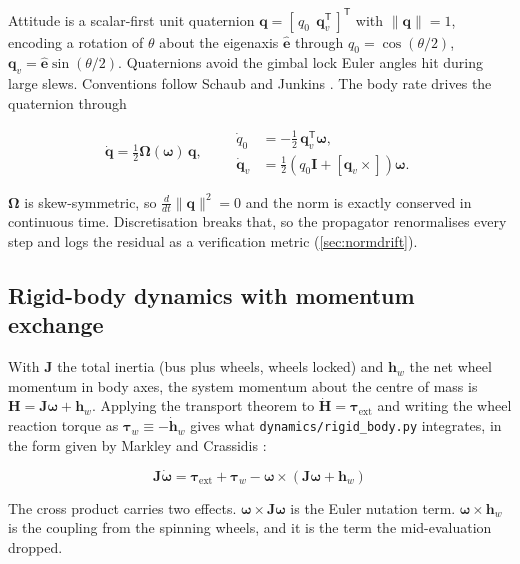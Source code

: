 \documentclass[conference,10pt,a4paper]{IEEEtran}
\newenvironment{eqbox}{\ignorespaces}{\ignorespacesafterend}
\newcommand{\vect}[1]{\bm{#1}}
\newcommand{\mat}[1]{\bm{#1}}
\newcommand{\T}{^{\mathsf{T}}}
\newcommand{\skewm}[1]{\left[#1\times\right]}
\begin{document}
Attitude is a scalar-first unit quaternion
$\vect{q} = [\,q_0\ \ \vect{q}_v\T\,]\T$ with $\|\vect{q}\|=1$, encoding a
rotation of $\theta$ about the eigenaxis $\hat{\vect{e}}$ through
$q_0=\cos(\theta/2)$, $\vect{q}_v=\hat{\vect{e}}\sin(\theta/2)$. Quaternions
avoid the gimbal lock Euler angles hit during large slews. Conventions follow
Schaub and Junkins \cite{schaub}. The body rate drives the quaternion through

\begin{equation}
\dot{\vect{q}} = \tfrac{1}{2}\mat{\Omega}(\vect{\omega})\,\vect{q},
\qquad
\begin{aligned}
\dot{q}_0 &= -\tfrac{1}{2}\,\vect{q}_v\T\vect{\omega},\\
\dot{\vect{q}}_v &= \tfrac{1}{2}\!\left(q_0\mat{I}+\skewm{\vect{q}_v}\right)\vect{\omega}.
\end{aligned}
\label{eq:kinematics}
\end{equation}

$\mat{\Omega}$ is skew-symmetric, so $\tfrac{d}{dt}\|\vect{q}\|^2 = 0$ and the
norm is exactly conserved in continuous time. Discretisation breaks that, so
the propagator renormalises every step and logs the residual as a verification
metric (\cref{sec:normdrift}).

\subsection{Rigid-body dynamics with momentum exchange}
\label{sec:dynamics}

With $\mat{J}$ the total inertia (bus plus wheels, wheels locked) and
$\vect{h}_w$ the net wheel momentum in body axes, the system momentum about
the centre of mass is $\vect{H}=\mat{J}\vect{\omega}+\vect{h}_w$. Applying the
transport theorem to $\dot{\vect{H}}=\vect{\tau}_\text{ext}$ and writing the
wheel reaction torque as $\vect{\tau}_w\equiv-\dot{\vect{h}}_w$ gives what
\texttt{dynamics/rigid\_body.py} integrates, in the form given by Markley and
Crassidis \cite{markley}:

\begin{eqbox}
\begin{equation}
\mat{J}\dot{\vect{\omega}}
= \vect{\tau}_\text{ext} + \vect{\tau}_w
- \vect{\omega}\times\!\left(\mat{J}\vect{\omega} + \vect{h}_w\right)
\label{eq:dynamics}
\end{equation}
\end{eqbox}

The cross product carries two effects. $\vect{\omega}\times\mat{J}\vect{\omega}$
is the Euler nutation term. $\vect{\omega}\times\vect{h}_w$ is the coupling
from the spinning wheels, and it is the term the mid-evaluation dropped.
\end{document}
